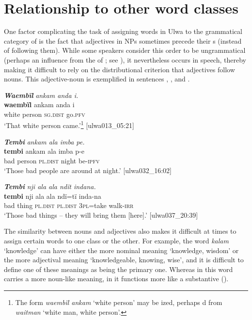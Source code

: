 \section{Relationship to other word classes}\label{sec:5.4}


One factor complicating the task of assigning words in Ulwa to the grammatical category of  is the fact that adjectives in NPs sometimes precede their s (instead of following them). While some speakers consider this order to be ungrammatical (perhaps an influence from the  of ; see ), it nevertheless occurs in speech, thereby making it difficult to rely on the distributional criterion that adjectives follow nouns. This adjective-noun  is exemplified in sentences , , and .

\ea%
    \label{ex:adj:11}
          \textbf{\textit{Waembïl}} \textit{ankam anda i.}\\
\gll    \textbf{waembïl}  ankam  anda    i\\
    white    person  \textsc{sg.dist}  go.\textsc{pfv}\\
\glt `That white person came.’\footnote{The form \textit{waembïl ankam} ‘white person’ may be ized, perhaps d from  \textit{waitman} ‘white man, white person’.}  [ulwa013\_05:21]
\z

\ea%
    \label{ex:adj:12}
          \textbf{\textit{Tembi}} \textit{ankam ala imba pe.}\\
\gll    \textbf{tembi}  ankam  ala      imba  p-e\\
    bad    person  \textsc{pl.dist}  night  be\textsc{{}-ipfv}\\
\glt `Those bad people are around at night.’ [ulwa032\_16:02]
\z

\ea%
    \label{ex:adj:13}
          \textbf{\textit{Tembi}} \textit{nji ala ala ndït indana.}\\
\gll    \textbf{tembi}  nji    ala      ala      ndï=tï    inda-na\\
    bad    thing  \textsc{pl.dist}  \textsc{pl.dist}  3\textsc{pl}=take  walk-\textsc{irr}\\
\glt `Those bad things -- they will bring them [here].’ [ulwa037\_20:39]
\z

  The  similarity between nouns and adjectives also makes it difficult at times to assign certain words to one class or the other. For example, the word \textit{kalam} ‘knowledge’ can have either the more nominal meaning ‘knowledge, wisdom’ or the more adjectival meaning ‘knowledgeable, knowing, wise’, and it is difficult to define one of these meanings as being the primary one. Whereas in  this word carries a more noun-like meaning, in  it functions more like a substantive  ().

